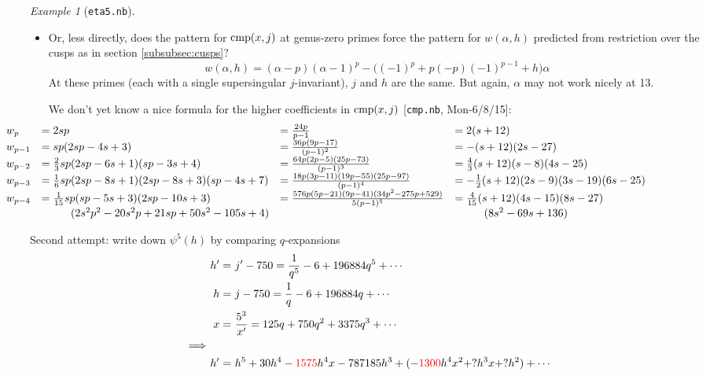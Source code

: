 \documentclass{rs}
\theoremstyle{definition}
\theoremstyle{remark}
\newtheorem{ex}[thm]{Example}
\newcommand{\cmp}{{\rm cmp}}
\newcommand{\A}{\alpha}
\renewcommand{\=}{\approx}
\renewcommand{\-}{\sim}
\newcommand{\rd}[1]{\textcolor{red}{#1}}
\numberwithin{equation}{section}
\numberwithin{thm}{section}
\begin{document}
\begin{ex}[\texttt{eta5.nb}]
\begin{itemize}
  \item Or, less directly, does the pattern for $\cmp(x,j)$ at genus-zero primes force the pattern for $w(\A,h)$ 
  predicted from restriction over the cusps as in section \ref{subsubsec:cusps}?  
  \[
   w(\A,h) = (\A - p) (\A - 1)^p - \big((-1)^p + p (-p) (-1)^{p - 1} + h\big) \A 
  \]
  At these primes (each with a single supersingular $j$-invariant), $j$ and $h$ are the same.  
  But again, $\A$ may not work nicely at 13.  

  We don't yet know a nice formula for the higher coefficients in $\cmp(x,j)$ [\texttt{cmp.nb}, Mon-6/8/15]: 
  \[\hskip -3.3cm
   \begin{array}{llll}
    w_p & = 2 s p & = \frac{24 p}{p - 1} & = 2 (s + 12) \\
    w_{p - 1} & = s p (2 s p - 4 s + 3) & = \frac{36 p (9 p - 17)}{(p - 1)^2} & = -(s + 12) (2 s - 27) \\
    w_{p - 2} & = \frac{2}{3} s p (2 s p - 6 s + 1) (s p - 3 s + 4) & = \frac{64 p (2 p - 5) (25 p - 73)}{(p - 1)^3} & = \frac{4}{3} (s + 12) (s - 8) (4 s - 25) \\
    w_{p - 3} & = \frac{1}{6} s p (2 s p - 8 s + 1) (2 s p - 8 s + 3) (s p - 4 s + 7) & = \frac{18 p (3 p - 11) (19 p - 55) (25 p - 97)}{(p - 1)^4} & = -\frac{1}{2} (s + 12) (2 s - 9) (3 s - 19) (6 s - 25) \\
    w_{p - 4} & = \frac{1}{15} s p (s p - 5 s + 3) (2 s p - 10 s + 3) & = \frac{576 p (5 p - 21) (9 p - 41) (34 p^2 - 275 p + 529)}{5 (p - 1)^5} & = \frac{4}{15} (s + 12) (4 s - 15) (8 s - 27) \\
              & ~~~~~~~~ (2 s^2 p^2 - 20 s^2 p + 21 s p + 50 s^2 - 105 s + 4) & & ~~~~~~~~ (8 s^2 - 69 s + 136) 
   \end{array}
  \]
 \end{itemize}

 Second attempt: write down $\psi^5(h)$ by comparing $q$-expansions 
 \begin{equation*}
  \begin{split}
   h' = & ~ j' - 750 = \frac{1}{q^5} - 6 + 196884 q^5 + \cdots \\
    h = & ~ j - 750 = \frac{1}{q} - 6 + 196884 q + \cdots \\
    x = & ~ \frac{5^3}{x'} = 125 q + 750 q^2 + 3375 q^3 + \cdots \\
   \implies \qquad & \\
   h' = & ~ h^5 + 30 h^4 - \rd{1575} h^4 x - 787185 h^3 + (-\rd{1300} h^4 x^2 + ? h^3 x + ? h^2) + \cdots 
  \end{split}
 \end{equation*}
\end{ex}
\end{document}
